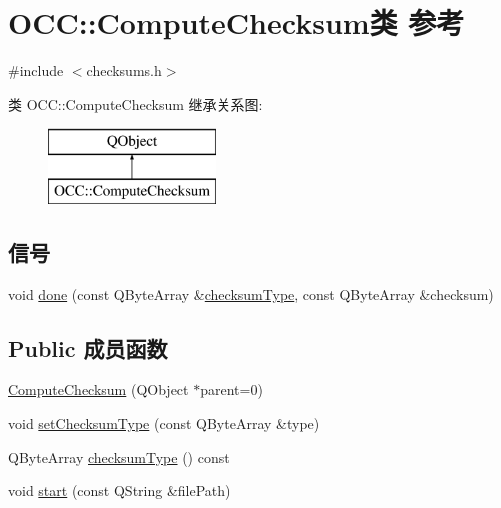 \hypertarget{class_o_c_c_1_1_compute_checksum}{}\section{O\+CC\+:\+:Compute\+Checksum类 参考}
\label{class_o_c_c_1_1_compute_checksum}


{\ttfamily \#include $<$checksums.\+h$>$}

类 O\+CC\+:\+:Compute\+Checksum 继承关系图\+:\begin{figure}[H]
\begin{center}
\leavevmode
\includegraphics[height=2.000000cm]{class_o_c_c_1_1_compute_checksum}
\end{center}
\end{figure}
\subsection*{信号}
\begin{DoxyCompactItemize}
\item 
void \hyperlink{class_o_c_c_1_1_compute_checksum_a01c9dfa1598209e73ef617c758831e72}{done} (const Q\+Byte\+Array \&\hyperlink{class_o_c_c_1_1_compute_checksum_a7eccc42b0c561aebf5920a47b4cf0d74}{checksum\+Type}, const Q\+Byte\+Array \&checksum)
\end{DoxyCompactItemize}
\subsection*{Public 成员函数}
\begin{DoxyCompactItemize}
\item 
\hyperlink{class_o_c_c_1_1_compute_checksum_a6b1e2c90eda442c669e1c1c39a4e0871}{Compute\+Checksum} (Q\+Object $\ast$parent=0)
\item 
void \hyperlink{class_o_c_c_1_1_compute_checksum_a250c402004fbbc938d63970cae5915eb}{set\+Checksum\+Type} (const Q\+Byte\+Array \&type)
\item 
Q\+Byte\+Array \hyperlink{class_o_c_c_1_1_compute_checksum_a7eccc42b0c561aebf5920a47b4cf0d74}{checksum\+Type} () const
\item 
void \hyperlink{class_o_c_c_1_1_compute_checksum_a1c151750dd262e30cc6691f86175f36c}{start} (const Q\+String \&file\+Path)
\end{DoxyCompactItemize}
